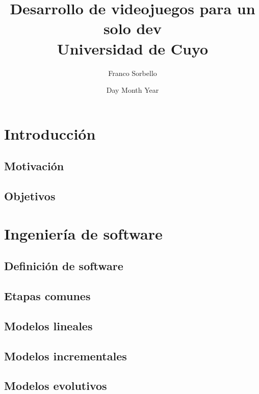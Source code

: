 \documentclass[12pt]{report}
\title{
    {Desarrollo de videojuegos para un solo dev}\\
    {\large Universidad de Cuyo}\\
}
\author{Franco Sorbello}
\date{Day Month Year}
\begin{document}
\maketitle
\tableofcontents
% 
%
\chapter{Introducción}

\section{Motivación}


\section{Objetivos}


% 
%
\chapter{Ingeniería de software}

\section{Definición de software}


\section{Etapas comunes} 


\section{Modelos lineales}


\section{Modelos incrementales}


\section{Modelos evolutivos}
\label{sec:modelos_evolutivos}

\end{document}
